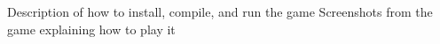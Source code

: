 
Description of how to install, compile, and run the game
Screenshots from the game explaining how to play it
